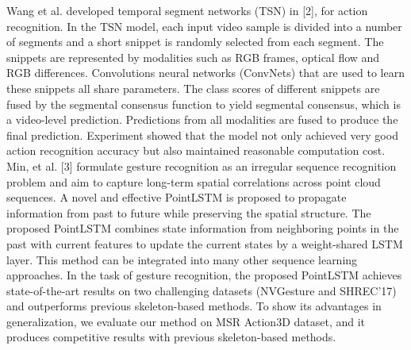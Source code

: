 \documentclass[oneside,a4paper,12pt]{report}
\begin{document}
    Wang et al. developed temporal segment networks (TSN) in [2], for action recognition. In the TSN model, each input video sample is divided into a number of segments and a short snippet is randomly selected from each segment. The snippets are represented by modalities such as RGB frames, optical flow and RGB differences. Convolutions neural networks (ConvNets) that are used to learn these snippets all share parameters. The class scores of different snippets are fused by the segmental consensus function to yield segmental consensus, which is a video-level prediction. Predictions from all modalities are fused to produce the final prediction. Experiment showed that the model not only achieved very good action recognition accuracy but also maintained reasonable computation cost. 
    Min, et al. [3] formulate gesture recognition as an irregular sequence recognition problem and aim to capture long-term spatial correlations across point cloud sequences. A novel and effective PointLSTM is proposed to propagate information from past to future while preserving the spatial structure. The proposed PointLSTM combines state information from neighboring points in the past with current features to update the current states by a weight-shared LSTM layer. This method can be integrated into many other sequence learning approaches. In the task of gesture recognition, the proposed PointLSTM achieves state-of-the-art results on two challenging datasets (NVGesture and SHREC'17) and outperforms previous skeleton-based methods. To show its advantages in generalization, we evaluate our method on MSR Action3D dataset, and it produces competitive results with previous skeleton-based methods.
    
\end{document}
